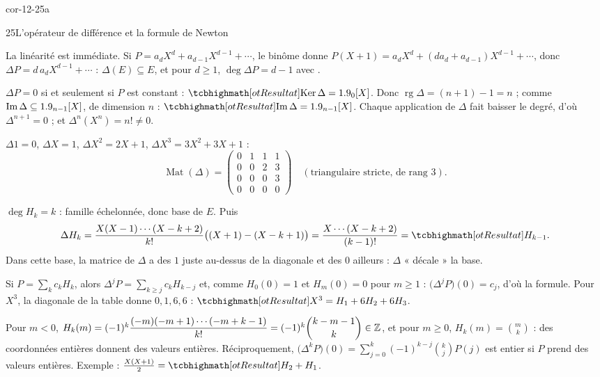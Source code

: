 
\begin{blocLivre}{cor-12-25a}
\begin{corrige}{25}{L'opérateur de différence et la formule de Newton}
\begin{questions}
  \item La linéarité est immédiate. Si $P=a_dX^{d}+a_{d-1}X^{d-1}+\cdots$,
    le binôme donne $P(X+1)=a_dX^{d}+(da_d+a_{d-1})X^{d-1}+\cdots$, donc
    $\Delta P=d\,a_dX^{d-1}+\cdots$ : $\Delta(E)\subseteq E$, et pour
    $d\geqslant1$, $\deg\Delta P=d-1$ avec .
  \item $\Delta P=0$ si et seulement si $P$ est constant :
    $\res{\operatorname{Ker}\Delta=\R_0[X]}$. Donc
    $\operatorname{rg}\Delta=(n+1)-1=n$ ; comme
    $\operatorname{Im}\Delta\subseteq1.9_{n-1}[X]$, de dimension $n$ :
    $\res{\operatorname{Im}\Delta=\R_{n-1}[X]}$. Chaque application de
    $\Delta$ fait baisser le degré, d'où $\Delta^{n+1}=0$ ; et
    $\Delta^{n}(X^{n})=n!\neq0$.
  \item $\Delta1=0$, $\Delta X=1$, $\Delta X^{2}=2X+1$,
    $\Delta X^{3}=3X^{2}+3X+1$ :
    \[
    \operatorname{Mat}(\Delta)=\begin{pmatrix}0&1&1&1\\0&0&2&3\\0&0&0&3\\0&0&0&0\end{pmatrix}
    \quad(\text{triangulaire stricte, de rang }3).
    \]
\end{questions}
\begin{questions}[resume]
  \item $\deg H_k=k$ : famille échelonnée, donc base de $E$. Puis
    \[
    \Delta H_k=\frac{X(X-1)\cdots(X-k+2)}{k!}\bigl((X+1)-(X-k+1)\bigr)
    =\frac{X\cdots(X-k+2)}{(k-1)!}=\res{H_{k-1}} .
    \]
    Dans cette base, la matrice de $\Delta$ a des $1$ juste au-dessus de la
    diagonale et des $0$ ailleurs : $\Delta$ « décale » la base.
  \item Si $P=\sum_kc_kH_k$, alors $\Delta^{j}P=\sum_{k\geqslant j}c_kH_{k-j}$
    et, comme $H_0(0)=1$ et $H_m(0)=0$ pour $m\geqslant1$ :
    $\bigl(\Delta^{j}P\bigr)(0)=c_j$, d'où la formule. Pour $X^{3}$, la
    diagonale de la table donne $0,1,6,6$ :
    $\res{X^{3}=H_1+6H_2+6H_3}$.
  \item Pour $m<0$,
    $H_k(m)=(-1)^{k}\dfrac{(-m)(-m+1)\cdots(-m+k-1)}{k!}=(-1)^{k}\dbinom{k-m-1}{k}\in\mathbb{Z}$,
    et pour $m\geqslant0$, $H_k(m)=\binom mk$ : des coordonnées entières
    donnent des valeurs entières. Réciproquement,
    $\bigl(\Delta^{k}P\bigr)(0)=\sum_{j=0}^{k}(-1)^{k-j}\binom kj P(j)$ est
    entier si $P$ prend des valeurs entières. Exemple :
    $\frac{X(X+1)}{2}=\res{H_2+H_1}$.
\end{questions}
\end{corrige}
\end{blocLivre}

